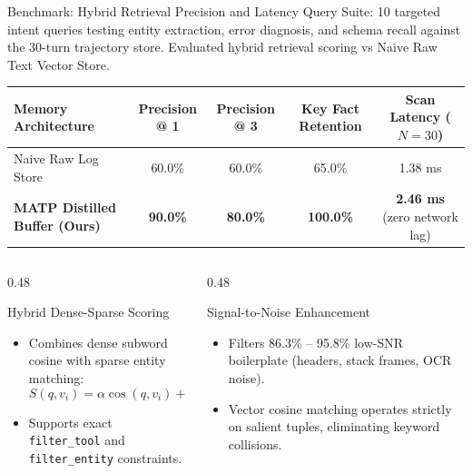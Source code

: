 \documentclass[aspectratio=169,10pt]{beamer}
\begin{document}
\begin{frame}{Benchmark: Hybrid Retrieval Precision and Latency}
  {\footnotesize Query Suite: 10 targeted intent queries testing entity extraction, error diagnosis, and schema recall against the 30-turn trajectory store. Evaluated hybrid retrieval scoring vs Naive Raw Text Vector Store.}

  \vspace{0.3em}
  \begin{table}
    \centering
    \footnotesize
    \begin{tabular}{lcccc}
      \toprule
      Memory Architecture & Precision @ 1 & Precision @ 3 & Key Fact Retention & Scan Latency ($N=30$)\\
      \midrule
      Naive Raw Log Store & 60.0\% & 60.0\% & 65.0\% & 1.38 ms\\
      \textbf{MATP Distilled Buffer (Ours)} & \textbf{90.0\%} & \textbf{80.0\%} & \textbf{100.0\%} & \textbf{2.46 ms} (zero network lag)\\
      \bottomrule
    \end{tabular}
  \end{table}

  \begin{columns}[T,onlytextwidth]
    \begin{column}{0.48\textwidth}
      \begin{block}{Hybrid Dense-Sparse Scoring}
        \begin{itemize}
          \footnotesize
          \item Combines dense subword cosine with sparse entity matching:
            \[
              S(q, v_i) = \alpha \cos(q, v_i) + (1-\alpha) \mathrm{Overlap}(q, G_i)
            \]
          \item Supports exact \texttt{filter\_tool} and \texttt{filter\_entity} constraints.
        \end{itemize}
      \end{block}
    \end{column}
    \begin{column}{0.48\textwidth}
      \begin{block}{Signal-to-Noise Enhancement}
        \begin{itemize}
          \footnotesize
          \item Filters 86.3\% -- 95.8\% low-SNR boilerplate (headers, stack frames, OCR noise).
          \item Vector cosine matching operates strictly on salient tuples, eliminating keyword collisions.
        \end{itemize}
      \end{block}
    \end{column}
  \end{columns}
\end{frame}
\end{document}
